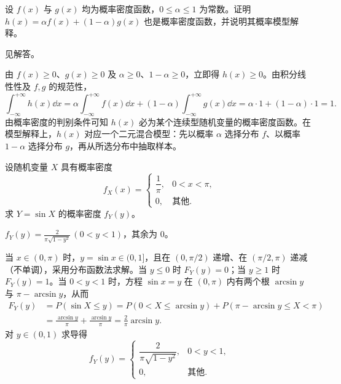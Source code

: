 \begin{exercise}[title={概率密度的凸组合},level=advanced,points=8,tags={概率密度,证明}]
设 $f(x)$ 与 $g(x)$ 均为概率密度函数，$0\le\alpha\le 1$ 为常数。证明 $h(x)=\alpha f(x)+(1-\alpha)g(x)$ 也是概率密度函数，并说明其概率模型解释。
\begin{answer}
见解答。
\end{answer}
\begin{solution}
由 $f(x)\ge 0$、$g(x)\ge 0$ 及 $\alpha\ge 0$、$1-\alpha\ge 0$，立即得 $h(x)\ge 0$。由积分线性性及 $f,g$ 的规范性，
\[
  \int_{-\infty}^{+\infty}h(x)\dd x
  =\alpha\int_{-\infty}^{+\infty}f(x)\dd x+(1-\alpha)\int_{-\infty}^{+\infty}g(x)\dd x
  =\alpha\cdot 1+(1-\alpha)\cdot 1=1.
\]
由概率密度的判别条件可知 $h(x)$ 必为某个连续型随机变量的概率密度函数。在模型解释上，$h(x)$ 对应一个二元混合模型：先以概率 $\alpha$ 选择分布 $f$、以概率 $1-\alpha$ 选择分布 $g$，再从所选分布中抽取样本。
\end{solution}
\end{exercise}

\begin{exercise}[title={非单调三角函数变换},level=advanced,points=10,tags={随机变量函数,多分支}]
设随机变量 $X$ 具有概率密度
\[
  f_X(x)=
  \begin{cases}
    \dfrac{1}{\pi},& 0<x<\pi,\\
    0,& \text{其他}.
  \end{cases}
\]
求 $Y=\sin X$ 的概率密度 $f_Y(y)$。
\begin{answer}
$f_Y(y)=\frac{2}{\pi\sqrt{1-y^2}}\,(0<y<1)$，其余为 $0$。
\end{answer}
\begin{solution}
当 $x\in(0,\pi)$ 时，$y=\sin x\in(0,1]$，且在 $(0,\pi/2)$ 递增、在 $(\pi/2,\pi)$ 递减（不单调），采用分布函数法求解。当 $y\le 0$ 时 $F_Y(y)=0$；当 $y\ge 1$ 时 $F_Y(y)=1$。当 $0<y<1$ 时，方程 $\sin x=y$ 在 $(0,\pi)$ 内有两个根 $\arcsin y$ 与 $\pi-\arcsin y$，从而
\[
\begin{aligned}
  F_Y(y)&=P(\sin X\le y)
  =P(0<X\le\arcsin y)+P(\pi-\arcsin y\le X<\pi)\\
  &=\frac{\arcsin y}{\pi}+\frac{\arcsin y}{\pi}=\frac{2}{\pi}\arcsin y.
\end{aligned}
\]
对 $y\in(0,1)$ 求导得
\[
  f_Y(y)=
  \begin{cases}
    \dfrac{2}{\pi\sqrt{1-y^2}},& 0<y<1,\\
    0,& \text{其他}.
  \end{cases}
\]
\end{solution}
\end{exercise}
